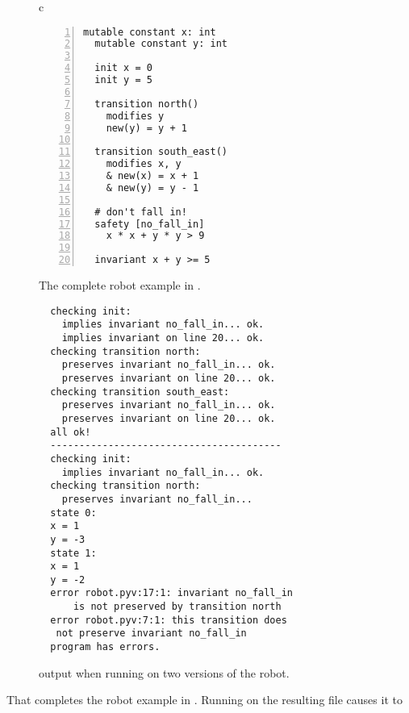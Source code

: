 \begin{figure}[t]
  \begin{minipage}[b]{.4\textwidth}
  \begin{center}
  \begin{tabular}{c}
  \begin{lstlisting}[language=mypyvy, numbers=left]
  mutable constant x: int
  mutable constant y: int

  init x = 0
  init y = 5

  transition north()
    modifies y
    new(y) = y + 1

  transition south_east()
    modifies x, y
    & new(x) = x + 1
    & new(y) = y - 1

  # don't fall in!
  safety [no_fall_in]
    x * x + y * y > 9

  invariant x + y >= 5
  \end{lstlisting}
  \end{tabular}
  \end{center}
  \vspace{1.5cm}
  \caption{The complete robot example in \mypyvy.}
  \label{fig:robot-mypyvy}
  \end{minipage}%
  \hfil%
  \begin{minipage}[b]{.5\textwidth}
  \begin{center}
    {\footnotesize
  \begin{verbatim}
  checking init:
    implies invariant no_fall_in... ok.
    implies invariant on line 20... ok.
  checking transition north:
    preserves invariant no_fall_in... ok.
    preserves invariant on line 20... ok.
  checking transition south_east:
    preserves invariant no_fall_in... ok.
    preserves invariant on line 20... ok.
  all ok!
  ----------------------------------------
  checking init:
    implies invariant no_fall_in... ok.
  checking transition north:
    preserves invariant no_fall_in...
  state 0:
  x = 1
  y = -3
  state 1:
  x = 1
  y = -2
  error robot.pyv:17:1: invariant no_fall_in
      is not preserved by transition north
  error robot.pyv:7:1: this transition does
   not preserve invariant no_fall_in
  program has errors.
  \end{verbatim}
    }
  \end{center}
  \caption{\mypyvy output when running on two versions of the robot.}
  \label{fig:robot-mypyvy-output}
  \end{minipage}%
\end{figure}
That completes the robot example in \mypyvy.
Running \mypyvy on the resulting file causes it to
